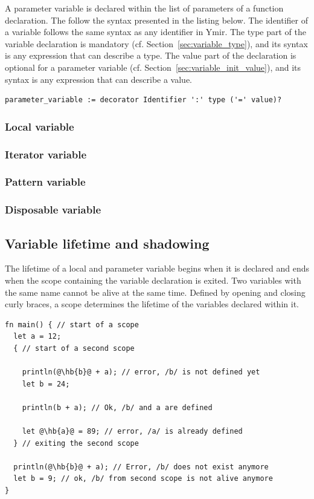 A parameter variable is declared within the list of parameters of a function
declaration. The follow the syntax presented in the listing below. The
identifier of a variable follows the same syntax as any identifier in Ymir. The
type part of the variable declaration is mandatory (cf.
Section~\ref{sec:variable_type}), and its syntax is any expression that can
describe a type. The value part of the declaration is optional for a parameter
variable (cf. Section~\ref{sec:variable_init_value}), and its syntax is any
expression that can describe a value.

\begin{lstlisting}[style=bashVerb]
parameter_variable := decorator Identifier ':' type ('=' value)?
\end{lstlisting}

\subsubsection*{Local variable}
\subsubsection*{Iterator variable}
\subsubsection*{Pattern variable}
\subsubsection*{Disposable variable}

\subsection{Variable lifetime and shadowing}

The lifetime of a local and parameter variable begins when it is declared and
ends when the scope containing the variable declaration is exited. Two variables
with the same name cannot be alive at the same time. Defined by opening and
closing curly braces, a scope determines the lifetime of the variables declared
within it.

\begin{lstlisting}[style=coloredverbatimError, escapechar=@]
fn main() { // start of a scope
  let a = 12;
  { // start of a second scope

    println(@\hb{b}@ + a); // error, /b/ is not defined yet
    let b = 24;

    println(b + a); // Ok, /b/ and a are defined

    let @\hb{a}@ = 89; // error, /a/ is already defined
  } // exiting the second scope

  println(@\hb{b}@ + a); // Error, /b/ does not exist anymore
  let b = 9; // ok, /b/ from second scope is not alive anymore
}
\end{lstlisting}

